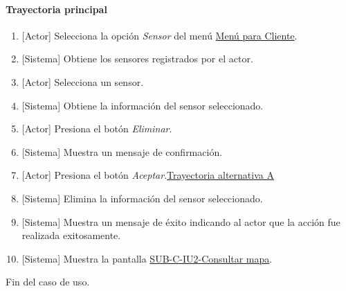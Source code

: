 \paragraph{Trayectoria principal}
	\begin{enumerate}
		\item {[Actor]} Selecciona la opción \textit{Sensor} del menú \hyperref[fig:menu-cliente]{Menú para Cliente}.
		\item {[Sistema]} Obtiene los sensores registrados por el actor.
		\item {[Actor]} Selecciona un sensor.
		\item {[Sistema]} Obtiene la información del sensor seleccionado.
		\item {[Actor]} Presiona el botón \textit{Eliminar}.
		\item {[Sistema]} Muestra un mensaje de confirmación.
		\item {[Actor]} Presiona el botón \textit{Aceptar}.\hyperref[SUB-U-CU13:TA]{Trayectoria alternativa A}
		\item {[Sistema]} Elimina la información del sensor seleccionado.
		\item {[Sistema]} Muestra un mensaje de éxito indicando al actor que la acción fue realizada exitosamente.
		\item \label{SUB-U-CU15:Pantalla} {[Sistema]} Muestra la pantalla \hyperref[fig:sub-c-iu2]{SUB-C-IU2-Consultar mapa}.
	\end{enumerate}
	Fin del caso de uso.

